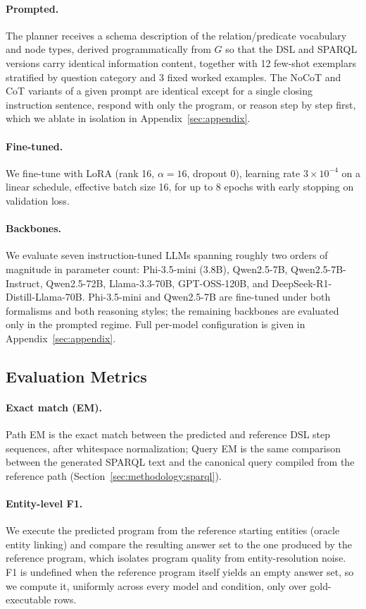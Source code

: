 \paragraph{Prompted.} The planner receives a schema description of the relation/predicate vocabulary and node types, derived programmatically from $G$ so that the DSL and SPARQL versions carry identical information content, together with 12 few-shot exemplars stratified by question category and 3 fixed worked examples. The NoCoT and CoT variants of a given prompt are identical except for a single closing instruction sentence, respond with only the program, or reason step by step first, which we ablate in isolation in Appendix~\ref{sec:appendix}.

\paragraph{Fine-tuned.} We fine-tune with LoRA (rank 16, $\alpha{=}16$, dropout 0), learning rate $3\times10^{-4}$ on a linear schedule, effective batch size 16, for up to 8 epochs with early stopping on validation loss.

\paragraph{Backbones.} We evaluate seven instruction-tuned LLMs spanning roughly two orders of magnitude in parameter count: Phi-3.5-mini (3.8B), Qwen2.5-7B, Qwen2.5-7B-Instruct, Qwen2.5-72B, Llama-3.3-70B, GPT-OSS-120B, and DeepSeek-R1-Distill-Llama-70B. Phi-3.5-mini and Qwen2.5-7B are fine-tuned under both formalisms and both reasoning styles; the remaining backbones are evaluated only in the prompted regime. Full per-model configuration is given in Appendix~\ref{sec:appendix}.

\subsection{Evaluation Metrics}
\label{sec:methodology:metrics}

\paragraph{Exact match (EM).} Path EM is the exact match between the predicted and reference DSL step sequences, after whitespace normalization; Query EM is the same comparison between the generated SPARQL text and the canonical query compiled from the reference path (Section~\ref{sec:methodology:sparql}).

\paragraph{Entity-level F1.} We execute the predicted program from the reference starting entities (oracle entity linking) and compare the resulting answer set to the one produced by the reference program, which isolates program quality from entity-resolution noise. F1 is undefined when the reference program itself yields an empty answer set, so we compute it, uniformly across every model and condition, only over gold-executable rows.
